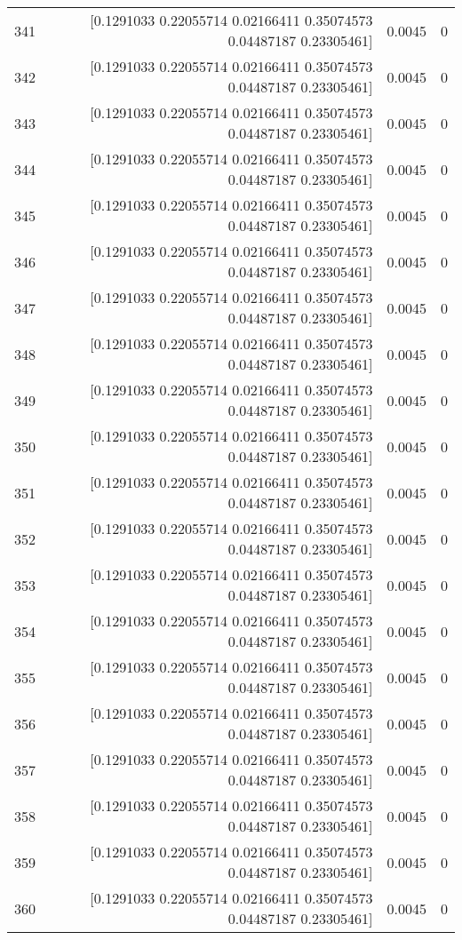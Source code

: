 \begin{longtable}{lrrr}
341 & [0.1291033  0.22055714 0.02166411 0.35074573 0.04487187 0.23305461] & 0.0045 & 0 \\
342 & [0.1291033  0.22055714 0.02166411 0.35074573 0.04487187 0.23305461] & 0.0045 & 0 \\
343 & [0.1291033  0.22055714 0.02166411 0.35074573 0.04487187 0.23305461] & 0.0045 & 0 \\
344 & [0.1291033  0.22055714 0.02166411 0.35074573 0.04487187 0.23305461] & 0.0045 & 0 \\
345 & [0.1291033  0.22055714 0.02166411 0.35074573 0.04487187 0.23305461] & 0.0045 & 0 \\
346 & [0.1291033  0.22055714 0.02166411 0.35074573 0.04487187 0.23305461] & 0.0045 & 0 \\
347 & [0.1291033  0.22055714 0.02166411 0.35074573 0.04487187 0.23305461] & 0.0045 & 0 \\
348 & [0.1291033  0.22055714 0.02166411 0.35074573 0.04487187 0.23305461] & 0.0045 & 0 \\
349 & [0.1291033  0.22055714 0.02166411 0.35074573 0.04487187 0.23305461] & 0.0045 & 0 \\
350 & [0.1291033  0.22055714 0.02166411 0.35074573 0.04487187 0.23305461] & 0.0045 & 0 \\
351 & [0.1291033  0.22055714 0.02166411 0.35074573 0.04487187 0.23305461] & 0.0045 & 0 \\
352 & [0.1291033  0.22055714 0.02166411 0.35074573 0.04487187 0.23305461] & 0.0045 & 0 \\
353 & [0.1291033  0.22055714 0.02166411 0.35074573 0.04487187 0.23305461] & 0.0045 & 0 \\
354 & [0.1291033  0.22055714 0.02166411 0.35074573 0.04487187 0.23305461] & 0.0045 & 0 \\
355 & [0.1291033  0.22055714 0.02166411 0.35074573 0.04487187 0.23305461] & 0.0045 & 0 \\
356 & [0.1291033  0.22055714 0.02166411 0.35074573 0.04487187 0.23305461] & 0.0045 & 0 \\
357 & [0.1291033  0.22055714 0.02166411 0.35074573 0.04487187 0.23305461] & 0.0045 & 0 \\
358 & [0.1291033  0.22055714 0.02166411 0.35074573 0.04487187 0.23305461] & 0.0045 & 0 \\
359 & [0.1291033  0.22055714 0.02166411 0.35074573 0.04487187 0.23305461] & 0.0045 & 0 \\
360 & [0.1291033  0.22055714 0.02166411 0.35074573 0.04487187 0.23305461] & 0.0045 & 0 \\

\end{longtable}
